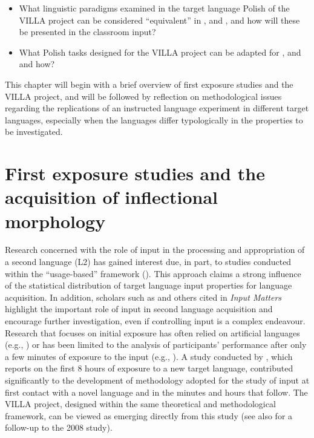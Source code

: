 \documentclass[output=paper,colorlinks,citecolor=brown,modfonts,nonflat]{../langscibook}
\begin{document}
\begin{itemize}
    \item What linguistic paradigms examined in the target language Polish of the VILLA project can be considered “equivalent” in ,  and , and how will these be presented in the classroom input?
    \item What Polish tasks designed for the VILLA project can be adapted for ,  and  and how?
\end{itemize}

This chapter will begin with a brief overview of first exposure studies and the VILLA project, and will be followed by reflection on methodological issues regarding the replications of an instructed language experiment in different target languages, especially when the languages differ typologically in the properties to be investigated.

\section{First exposure studies and the acquisition of inflectional morphology}\label{sec:watorek:2}

Research concerned with the role of input in the processing and appropriation of a second language (L2) has gained interest due, in part, to studies conducted within the “usage-based” framework (\citealt{Tomasello2003,Ellis2008}). This approach claims a strong influence of the statistical distribution of target language input properties for language acquisition. In addition, scholars such as \citet{Flege2009} and others cited in  \textit{Input Matters} highlight the important role of input in second language acquisition and encourage further investigation, even if controlling input is a complex endeavour. Research that focuses on initial exposure has often relied on artificial languages (e.g., \citealt{Reber1967, HulstijnDeKeyser1997, Williams2005}) or has been limited to the analysis of participants’ performance after only a few minutes of exposure to the input (e.g., \citealt{GullbergEtAl2012}). A study conducted by \citet{Rast2008}, which reports on the first 8 hours of exposure to a new target language, contributed significantly to the development of methodology adopted for the study of input at first contact with a novel language and in the minutes and hours that follow. The VILLA project, designed within the same theoretical and methodological framework, can be viewed as emerging directly from this study (see also \citealt{Rast2017} for a follow-up to the 2008 study).
\end{document}
